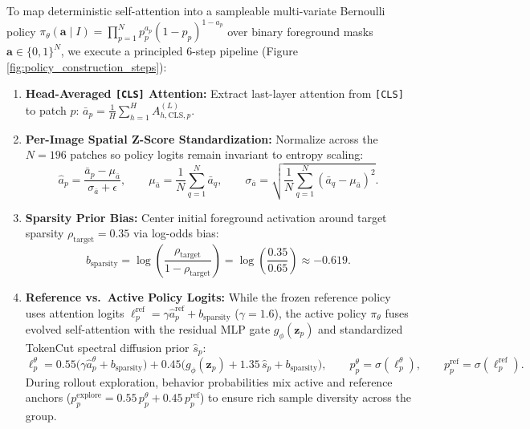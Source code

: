\documentclass[11pt,a4paper]{article}
\begin{document}
To map deterministic self-attention into a sampleable multi-variate Bernoulli policy $\pi_\theta(\mathbf{a} \mid I) = \prod_{p=1}^N p_p^{a_p}(1 - p_p)^{1 - a_p}$ over binary foreground masks $\mathbf{a} \in \{0, 1\}^N$, we execute a principled 6-step pipeline (Figure \ref{fig:policy_construction_steps}):
\begin{enumerate}[leftmargin=*,label=(\roman*)]
    \item \textbf{Head-Averaged \texttt{[CLS]} Attention:} Extract last-layer attention from \texttt{[CLS]} to patch $p$: $\bar{a}_p = \frac{1}{H}\sum_{h=1}^H A^{(L)}_{h, \text{CLS}, p}$.
    \item \textbf{Per-Image Spatial Z-Score Standardization:} Normalize across the $N=196$ patches so policy logits remain invariant to entropy scaling:
    \begin{equation}
    \hat{a}_p = \frac{\bar{a}_p - \mu_{\bar{a}}}{\sigma_{\bar{a}} + \epsilon}, \qquad \mu_{\bar{a}} = \frac{1}{N}\sum_{q=1}^N \bar{a}_q, \qquad \sigma_{\bar{a}} = \sqrt{\frac{1}{N}\sum_{q=1}^N (\bar{a}_q - \mu_{\bar{a}})^2}.
    \label{eq:zscore_attn}
    \end{equation}
    \item \textbf{Sparsity Prior Bias:} Center initial foreground activation around target sparsity $\rho_{\text{target}} = 0.35$ via log-odds bias:
    \begin{equation}
    b_{\text{sparsity}} = \log\!\left(\frac{\rho_{\text{target}}}{1 - \rho_{\text{target}}}\right) = \log\!\left(\frac{0.35}{0.65}\right) \approx -0.619.
    \label{eq:sparsity_bias}
    \end{equation}
    \item \textbf{Reference vs.\ Active Policy Logits:} While the frozen reference policy uses attention logits $\ell_p^{\text{ref}} = \gamma \hat{a}_p^{\text{ref}} + b_{\text{sparsity}}$ ($\gamma = 1.6$), the active policy $\pi_\theta$ fuses evolved self-attention with the residual MLP gate $g_\phi(\mathbf{z}_p)$ and standardized TokenCut spectral diffusion prior $\hat{s}_p$:
    \begin{equation}
    \ell_p^\theta = 0.55\big(\gamma \hat{a}_p^\theta + b_{\text{sparsity}}\big) + 0.45\big(g_\phi(\mathbf{z}_p) + 1.35\,\hat{s}_p + b_{\text{sparsity}}\big), \qquad p_p^\theta = \sigma(\ell_p^\theta), \qquad p_p^{\text{ref}} = \sigma(\ell_p^{\text{ref}}).
    \label{eq:policy_prob}
    \end{equation}
    During rollout exploration, behavior probabilities mix active and reference anchors ($p_p^{\text{explore}} = 0.55\,p_p^\theta + 0.45\,p_p^{\text{ref}}$) to ensure rich sample diversity across the group.
\end{enumerate}
\end{document}
